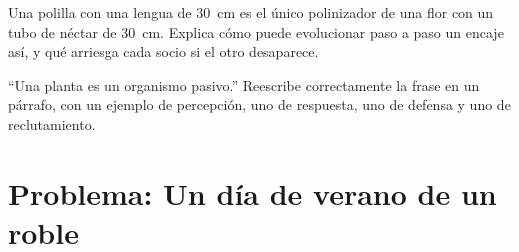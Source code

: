 \begin{exercise}[$\star\star\star$]\label{exo:g12:plant-rooted-life:14}
Una polilla con una lengua de \qty{30}{cm} es el único polinizador de
una flor con un tubo de néctar de \qty{30}{cm}. Explica cómo puede
evolucionar paso a paso un encaje así, y qué arriesga cada socio si el
otro desaparece.
\end{exercise}

\begin{exercise}[$\star\star\star$]\label{exo:g12:plant-rooted-life:15}
``Una planta es un organismo pasivo.'' Reescribe correctamente la frase
en un párrafo, con un ejemplo de percepción, uno de respuesta, uno de
defensa y uno de reclutamiento.
\end{exercise}

\section{Problema: Un día de verano de un roble}

